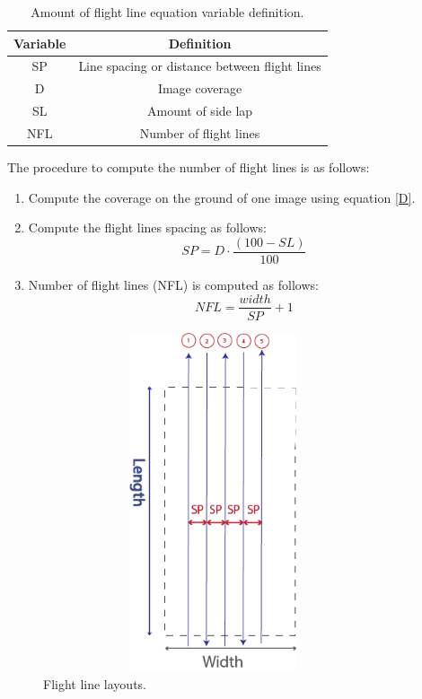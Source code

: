 \begin{table}[H]
\centering
\begin{tabular}{|c|c|}
\hline
\textbf{Variable} & \textbf{Definition}                           \\ \hline
SP                & Line spacing or distance between flight lines \\ \hline
D                 & Image coverage                                \\ \hline
SL                & Amount of side lap                            \\ \hline
NFL               & Number of flight lines                        \\ \hline
\end{tabular}
\label{Amount of flight line equation variable definition}
\caption{Amount of flight line equation variable definition.}
\end{table}
The procedure to compute the number of flight lines is as follows:
\begin{enumerate}
\item Compute the coverage on the ground of one image using equation \ref{D}.
\item Compute the flight lines spacing as follows:
\begin{equation}
SP = D\cdot \frac{(100-SL)}{100}
\end{equation}
\item Number of flight lines (NFL) is computed as follows:
\begin{equation}
NFL=\frac{width}{SP}+1
\end{equation}
\end{enumerate}
\begin{figure}[H]
\centering
\includegraphics[width=10cm,height=10cm,keepaspectratio]{imagenes/Line_layout.png}
\caption {Flight line layouts.}
\label{fig:flight_lines}
\end{figure}

